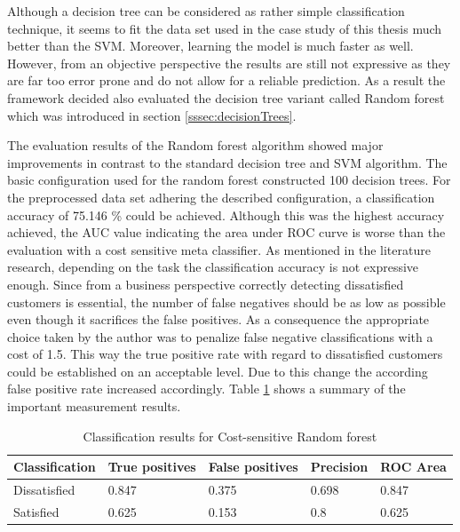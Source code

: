 Although a decision tree can be considered as rather simple classification technique, it seems to fit the data set used in the case study of this thesis much better than the SVM. Moreover, learning the model is much faster as well. However, from an objective perspective the results are still not expressive as they are far too error prone and do not allow for a reliable prediction. As a result the framework decided also evaluated the decision tree variant called Random forest which was introduced in section \ref{sssec:decisionTrees}. 

The evaluation results of the Random forest algorithm showed major improvements in contrast to the standard decision tree and SVM algorithm. The basic configuration used for the random forest constructed 100 decision trees. For the preprocessed data set adhering the described configuration, a classification accuracy of 75.146 \% could be achieved. Although this was the highest accuracy achieved, the AUC value indicating the area under ROC curve is worse than the evaluation with a cost sensitive meta classifier. As mentioned in the literature research, depending on the task the classification accuracy is not expressive enough. Since from a business perspective correctly detecting dissatisfied customers is essential, the number of false negatives should be as low as possible even though it sacrifices the false positives. As a consequence the appropriate choice taken by the author was to penalize false negative classifications with a cost of 1.5. This way the true positive rate with regard to dissatisfied customers could be established on an acceptable level. Due to this change the according false positive rate increased accordingly. Table \ref{tab:classificationResults} shows a summary of the important measurement results.

\begin{table}[]
	\centering
	\begin{tabular}{|l|l|l|l|l|}
		\hline
		\textbf{Classification} & \textbf{True positives} & \textbf{False positives} & \textbf{Precision} & \textbf{ROC Area} \\ \hline
		Dissatisfied            & 0.847                   & 0.375                    & 0.698              & 0.847             \\ \hline
		Satisfied               & 0.625                   & 0.153                    & 0.8                & 0.625             \\ \hline
	\end{tabular}
 	\caption{Classification results for Cost-sensitive Random forest}
 	\label{tab:classificationResults}
 \end{table}

